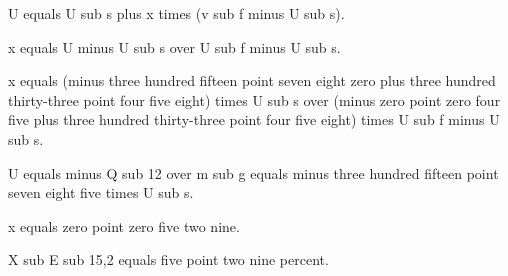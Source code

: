 U equals U sub s plus x times (v sub f minus U sub s).

x equals U minus U sub s over U sub f minus U sub s.

x equals (minus three hundred fifteen point seven eight zero plus three hundred thirty-three point four five eight) times U sub s over (minus zero point zero four five plus three hundred thirty-three point four five eight) times U sub f minus U sub s.

U equals minus Q sub 12 over m sub g equals minus three hundred fifteen point seven eight five times U sub s.

x equals zero point zero five two nine.

X sub E sub 15,2 equals five point two nine percent.